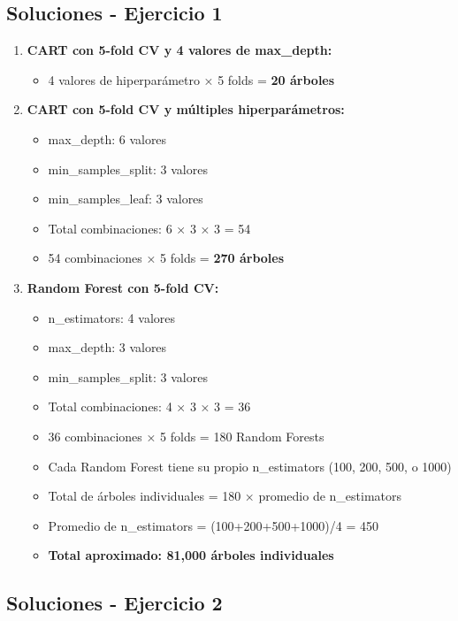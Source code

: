 \documentclass[12pt]{article}
\begin{document}
\subsection{Soluciones - Ejercicio 1}

\begin{enumerate}
    \item \textbf{CART con 5-fold CV y 4 valores de max\_depth:}
    \begin{itemize}
        \item 4 valores de hiperparámetro × 5 folds = \textbf{20 árboles}
    \end{itemize}
    
    \item \textbf{CART con 5-fold CV y múltiples hiperparámetros:}
    \begin{itemize}
        \item max\_depth: 6 valores
        \item min\_samples\_split: 3 valores  
        \item min\_samples\_leaf: 3 valores
        \item Total combinaciones: 6 × 3 × 3 = 54
        \item 54 combinaciones × 5 folds = \textbf{270 árboles}
    \end{itemize}
    
    \item \textbf{Random Forest con 5-fold CV:}
    \begin{itemize}
        \item n\_estimators: 4 valores
        \item max\_depth: 3 valores
        \item min\_samples\_split: 3 valores
        \item Total combinaciones: 4 × 3 × 3 = 36
        \item 36 combinaciones × 5 folds = 180 Random Forests
        \item Cada Random Forest tiene su propio n\_estimators (100, 200, 500, o 1000)
        \item Total de árboles individuales = 180 × promedio de n\_estimators
        \item Promedio de n\_estimators = (100+200+500+1000)/4 = 450
        \item \textbf{Total aproximado: 81,000 árboles individuales}
    \end{itemize}
\end{enumerate}

\subsection{Soluciones - Ejercicio 2}
\end{document}
